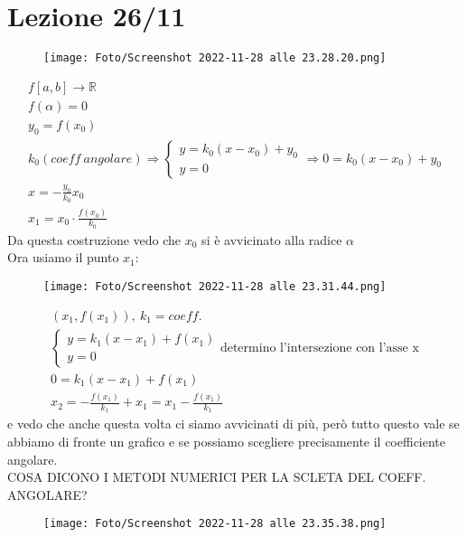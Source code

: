 \documentclass[a4paper, portrait]{book}
\numberwithin{equation}{chapter} %
\begin{document}
\chapter{Lezione 26/11}
\begin{figure}[h!]
    \centering
    \texttt{[image: Foto/Screenshot 2022-11-28 alle 23.28.20.png]}
    \caption{}
\end{figure}
\begin{gather}
    f[a,b]\rightarrow \mathbb{R}\\
    f(\alpha) = 0\\
    y_0 = f(x_0)\\
    k_0 (coeff \ angolare) \Rightarrow \begin{cases}
        y = k_0 (x-x_0) + y_0\\
        y = 0
    \end{cases} \Rightarrow 0 = k_0 (x-x_0) + y_0 \\
    x = - \frac{y_0}{k_0}x_0\\
    x_1 = x_0 \cdot \frac{f(x_0)}{k_0}
\end{gather}
Da questa costruzione vedo che $x_0$ si è avvicinato alla radice $\alpha$\\
Ora usiamo il punto $x_1$:
\begin{figure}[h!]
    \centering
    \texttt{[image: Foto/Screenshot 2022-11-28 alle 23.31.44.png]}
    \caption{}
\end{figure}
\begin{gather}
    (x_1, f(x_1)), \ k_1 = coeff.\\
    \begin{cases}
        y = k_1 (x-x_1)+f(x_1)\\
        y = 0
    \end{cases} \text{determino l'intersezione con l'asse x}\\
    0 = k_1(x - x_1) + f(x_1)\\
    x_2 = -\frac{f(x_1)}{k_1} + x_1 = x_1 - \frac{f(x_1)}{k_1}
\end{gather}
e vedo che anche questa volta ci siamo avvicinati di più, però tutto questo vale se abbiamo di fronte un grafico e se possiamo scegliere precisamente il coefficiente angolare.\\
\newpage
COSA DICONO I METODI NUMERICI PER LA SCLETA DEL COEFF. ANGOLARE?
\begin{figure}[h!]
    \centering
    \texttt{[image: Foto/Screenshot 2022-11-28 alle 23.35.38.png]}
    \caption{}
\end{figure}
\end{document}
